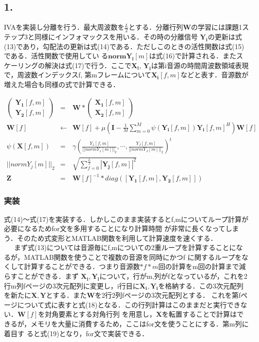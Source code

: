 \documentclass[a4j]{jarticle}
\begin{document}
\subsection{1.}
IVAを実装し分離を行う．最大周波数を$\frac{L}{2}$とする．分離行列$\bm{W}$の学習には課題1ステップ3と同様にインフォマックスを用いる．その時の分離信号
$\bm{Y_i}$の更新は式(13)であり，勾配法の更新は式(14)である．ただしこのときの活性関数は式(15)である．活性関数で使用してい
る$\bm{normY_i}[m]$は式(16)で計算される．またスケーリングの解決は式(17)で行う．ここで$\bm{X_i}$, $\bm{Y_i}$は第i音源の時間周波数領域表現
で，周波数インデックスf, 第mフレームについて$\bm{X_i}[f,m]$などと表す．音源数が増えた場合も同様の式で計算できる．

\begin{eqnarray}
\left(
 \begin{array}{cc}
  \bm{Y_1}[f,m]\\
  \bm{Y_2}[f,m]
 \end{array}
\right)
&=&
\bm{W} * 
\left(
 \begin{array}{cc}
  \bm{X_1}[f,m]\\
  \bm{X_2}[f,m]
 \end{array}
\right) \\
\bm{W}[f] &\leftarrow & \bm{W}[f] + \mu \left(\bm{I} - \frac{1}{M}\sum_{m=0}^{M}\psi (\bm{Y_i}[f,m])\bm{Y_i}[f,m]^H
					\right)\bm{W}[f] \\
\psi(\bm{X}[f,m]) &=& \gamma \left(\frac{Y_1[f,m]}{||normY_1[m]||_2}, \cdots ,
			      \frac{Y_J[f,m]}{||normY_J[m]||_2}\right)^t \\
||normY_j[m]||_2 &=& \sqrt{\sum_{f=0}^{\frac{L}{2}} |\bm{Y_j}[f,m]|^2} \\
\bm{Z} &=& \bm{W}[f]^{-1} * diag([\bm{Y_1}[f,m], \bm{Y_2}[f,m]])
\end{eqnarray}

\subsubsection{実装}
式(14)〜式(17)を実装する．しかしこのまま実装するとf,mについてループ計算が必要になるためfor文を多用することになり計算時間
が非常に長くなってしまう．そのため式変形とMATLAB関数を利用して計算速度を速くする．\\\ \ \ 
まず式(13)については音源毎にf,mについての2重ループを計算することになるが，MATLAB関数を使うことで複数の音源を同時にかつf
に関するループをなくして計算することができる．つまり音源数$* f * m$回の計算をm回の計算まで減らすことができる．まず
$\bm{X_i}, \bm{Y_i}$について，行がm,列がfとなっているが，これを2行m列fページの3次元配列に変更し，i行目に$\bm{X_i},
\bm{Y_i}$を格納する．この3次元配列を新たに$\bm{X}, \bm{Y}$とする．また$\bm{W}$を2行2列fページの3次元配列とする．
これを第fページについて式に表すと式(18)となる．この行列計算はこのままだと実行できない．$\bm{W}[f]$を対角要素とする対角行列
を用意し，$\bm{X}$を転置することで計算はできるが，メモリを大量に消費するため，ここはfor文を使うことにする．第m列に着目す
ると式(19)となり，for文で実装できる．
\end{document}
